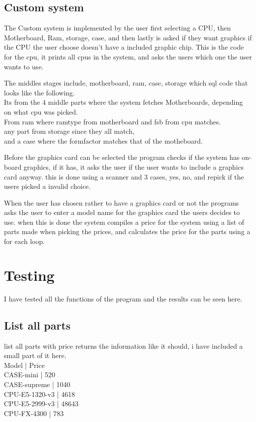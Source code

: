 \documentclass[a4paper,10pt,titlepage]{report}
\begin{document}
\subsection{Custom system}
The Custom system is implemented by the user first selecting a CPU, then Motherboard, Ram, storage, case, and then lastly is asked if they want graphics if the CPU the user choose doesn't have a included graphic chip.
This is the code for the cpu, it prints all cpus in the system, and asks the users which one the user wants to use. 

The middles stages include, motherboard, ram, case, storage which sql code that looks like the following. \\
Its from the 4 middle parts where the system fetches Motherboards, depending on what cpu was picked. \\
From ram where ramtype from motherboard and fsb from cpu matches.\\
any part from storage since they all match, \\
and a case where the formfactor matches that of the motheboard.

Before the graphics card can be selected the program checks if the system has on-board graphics, if it has, it asks the user if the user wants to include a graphics card anyway. this is done using a scanner and 3 cases, yes, no, and repick if the users picked a invalid choice. 

When the user has chosen rather to have a graphics card or not the programs asks the user to enter a model name for the graphics card the users decides to use.
when this is done the system compiles a price for the system using a list of parts made when picking the prices, and calculates the price for the parts using a for each loop.

\section{Testing}
I have tested all the functions of the program and the results can be seen here. \\
\vspace{5 mm}
\subsection{List all parts}
list all parts with price returns the information like it should, i have included a small part of it here. \\
Model                         | Price\\
CASE-mini                         | 520 \\
CASE-supreme                      | 1040 \\
CPU-E5-1320-v3                    | 4618 \\
CPU-E5-2999-v3                    | 48643 \\
CPU-FX-4300                       | 783 \\
\vspace{5 mm}
\end{document}
